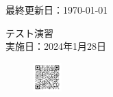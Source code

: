 \documentclass[a4paper,11pt]{jsarticle}
\begin{document}
\begin{titlepage}
  \hfill {最終更新日：\today}
  \begin{center}
    {\Huge\gt テスト演習}\\ \vspace{\baselineskip}
    \textup{\large 実施日：2024年1月28日}\\ 
  \end{center}
  \vfill
  \begin{figure}[H]
    \includegraphics[width=0.1\textwidth]{../images/qrcode.png}
  \end{figure}
\end{titlepage}

\qPart

\calcPage

\qPart

\calcPage

\qPart

\clearpage

\brankPage
\end{document}

